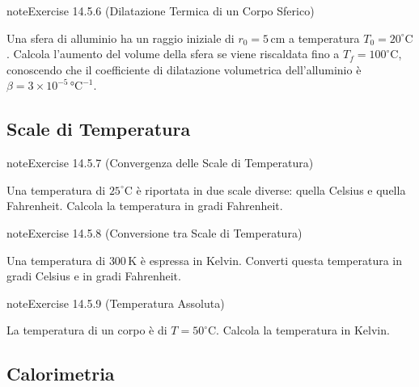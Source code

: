 \documentclass[letterpaper,10pt,italian]{jupyterBook}
\begin{document}
\begin{sphinxadmonition}{note}{Exercise 14.5.6 (Dilatazione Termica di un Corpo Sferico)}



\sphinxAtStartPar
Una sfera di alluminio ha un raggio iniziale di \(r_0 = 5 \, \text{cm}\) a temperatura \(T_0 = 20^\circ \text{C}\). Calcola l’aumento del volume della sfera se viene riscaldata fino a \(T_f = 100^\circ \text{C}\), conoscendo che il coefficiente di dilatazione volumetrica dell’alluminio è \(\beta = 3 \times 10^{-5} \, \text{°C}^{-1}\).
\end{sphinxadmonition}


\subsection{Scale di Temperatura}
\label{\detokenize{ch/thermodynamics/foundation-problems:scale-di-temperatura}} \label{exercise:ch/thermodynamics/foundation-problems-exercise-6}

\begin{sphinxadmonition}{note}{Exercise 14.5.7 (Convergenza delle Scale di Temperatura)}



\sphinxAtStartPar
Una temperatura di \(25^\circ \text{C}\) è riportata in due scale diverse: quella Celsius e quella Fahrenheit. Calcola la temperatura in gradi Fahrenheit.
\end{sphinxadmonition}
 \label{exercise:ch/thermodynamics/foundation-problems-exercise-7}

\begin{sphinxadmonition}{note}{Exercise 14.5.8 (Conversione tra Scale di Temperatura)}



\sphinxAtStartPar
Una temperatura di \(300 \, \text{K}\) è espressa in Kelvin. Converti questa temperatura in gradi Celsius e in gradi Fahrenheit.
\end{sphinxadmonition}
 \label{exercise:ch/thermodynamics/foundation-problems-exercise-8}

\begin{sphinxadmonition}{note}{Exercise 14.5.9 (Temperatura Assoluta)}



\sphinxAtStartPar
La temperatura di un corpo è di \(T = 50^\circ \text{C}\). Calcola la temperatura in Kelvin.
\end{sphinxadmonition}


\subsection{Calorimetria}
\label{\detokenize{ch/thermodynamics/foundation-problems:id1}} \label{exercise:ch/thermodynamics/foundation-problems-exercise-9}
\end{document}
